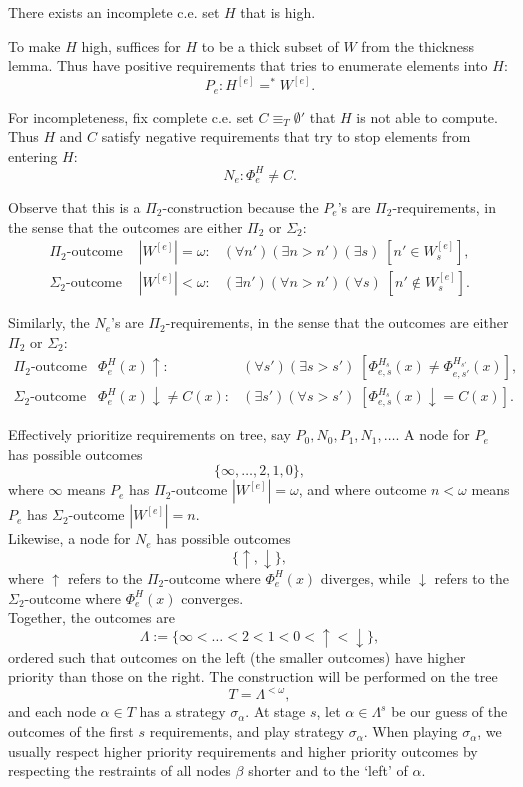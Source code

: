 \begin{theorem}
  There exists an incomplete c.e. set $H$ that is high.
\end{theorem}

To make $H$ high, suffices for $H$ to be a thick subset of $W$ from the
thickness lemma. Thus have positive requirements that tries to enumerate
elements into $H$:
\[P_e: H^{[e]} =^* W^{[e]}.\]

For incompleteness, fix complete c.e. set $C\equiv_T \emptyset'$ that $H$
is not able to compute. Thus $H$ and $C$ satisfy negative requirements
that try to stop elements from entering $H$:
\[N_e: \Phi_e^H \neq C.\]

Observe that this is a $\Pi_2$-construction because the $P_e$'s are
$\Pi_2$-requirements, in the sense that the outcomes are either $\Pi_2$
or $\Sigma_2$:
\begin{align*}
  \Pi_2\text{-outcome } &|W^{[e]}|=\omega: &(\forall n')(\exists
    n>n')(\exists s)\; [n'\in W^{[e]}_s],\\
  \Sigma_2\text{-outcome } &|W^{[e]}|<\omega: &(\exists n')(\forall
    n>n')(\forall s)\; [n'\not\in W^{[e]}_s].
\end{align*}

Similarly, the $N_e$'s are $\Pi_2$-requirements, in the sense that the
outcomes are either $\Pi_2$ or $\Sigma_2$:
\begin{align*}
  \Pi_2\text{-outcome } &\Phi_e^H(x)\uparrow: &(\forall s')(\exists
    s>s')\; [\Phi^{H_s}_{e,s}(x) \neq \Phi^{H_{s'}}_{e,s'}(x)],\\
  \Sigma_2\text{-outcome } &\Phi_e^H(x)\downarrow \neq C(x): &(\exists
    s')(\forall s>s')\; [\Phi^{H_s}_{e,s}(x) \downarrow=C(x)].
\end{align*}

Effectively prioritize requirements on tree, say
$P_0,N_0,P_1,N_1,\ldots$. A node for $P_e$ has possible outcomes
\[\{\infty, \ldots, 2, 1, 0\},\]
where $\infty$ means $P_e$ has $\Pi_2$-outcome $|W^{[e]}|=\omega$, and
where outcome $n<\omega$ means $P_e$ has $\Sigma_2$-outcome
$|W^{[e]}|=n$.\\

Likewise, a node for $N_e$ has possible outcomes
\[\{\uparrow, \downarrow\},\]
where $\uparrow$ refers to the $\Pi_2$-outcome where $\Phi_e^H(x)$
diverges, while $\downarrow$ refers to the $\Sigma_2$-outcome where
$\Phi_e^H(x)$ converges.\\

Together, the outcomes are
\[\Lambda :=\{\infty <\ldots <2<1<0 <\uparrow <\downarrow\},\]
ordered such that outcomes on the left (the smaller outcomes) have higher
priority than those on the right. The construction will be performed on
the tree
\[T =\Lambda^{<\omega},\]
and each node $\alpha\in T$ has a strategy $\sigma_\alpha$. At stage $s$,
let $\alpha\in \Lambda^s$ be our guess of the outcomes of the first
$s$ requirements, and play strategy $\sigma_\alpha$. When playing
$\sigma_\alpha$, we usually respect higher priority requirements and
higher priority outcomes by respecting the restraints of all nodes
$\beta$ shorter and to the `left' of $\alpha$.\\

